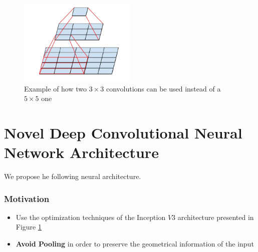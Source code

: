 \documentclass[a0, portrait]{IWIposter}
\begin{document}
\begin{multicols}{3}
\begin{itemize}
\end{itemize}

\begin{figure}[H]
	\centering
	\includegraphics[width=0.5\textwidth]{ConvolutionsExample.png}
	\caption{Example of how two $3 \times 3$ convolutions can be used instead of a $5 \times 5$ one}
	\label{fig:ConvolutionsExample}
\end{figure}



\section*{Novel Deep Convolutional Neural Network Architecture}

We propose he following neural architecture.

\centering
\subsubsection*{Motivation}
	\begin{itemize}
		\item Use the optimization techniques of the Inception $V3$ architecture presented in Figure \ref{fig:ConvolutionsExample}
		\item \textbf{Avoid Pooling} in order to preserve the geometrical information of the input

	\end{itemize}

\centering

\end{multicols}
\end{document}
